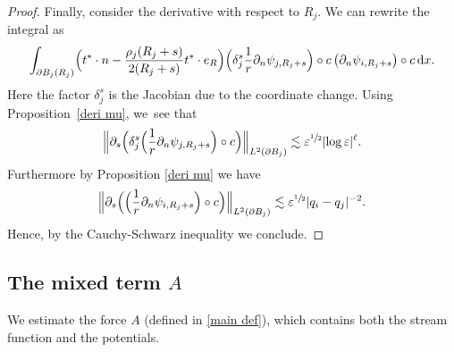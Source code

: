 \documentclass[10pt]{amsart}
\let\epsilon\varepsilon
\theoremstyle{definition}
\newcommand\Bnorm[1]{\Bigl\lVert #1\Bigr\rVert}
\newcommand\dd{\,\mathrm{d}}
\newcommand\dx{\dd x}
\let\de\partial
\let\eps\epsilon
\begin{document}
\begin{proof}
Finally, consider the derivative with respect to $R_j$.
We can rewrite the integral as
\begin{align*}
\int_{\de B_j(R_j)}\Bigl(t^*\cdot n-\frac{\rho_j(R_j+s)}{2(R_j+s)}t^*\cdot e_R\Bigr)\Bigl(\delta_j^s\frac{1}{r}\de_n\psi_{j,R_j+s}\Bigr)\circ c\left(\de_n\psi_{i,R_j+s}\right)\circ c\dx.
\end{align*}
Here the factor $\delta_j^s$ is the Jacobian due to the coordinate change.
Using Proposition~\ref{deri mu}, we~see that
\begin{align*}
\Bnorm{\de_s\Bigl(\delta_j^s\Bigl(\frac{1}{r}\de_n\psi_{j,R_j+s}\Bigr)\circ c\Bigr)}_{L^2(\de B_j)}\lesssim \eps^{\sfrac{1}{2}}|{\log\eps}|^\ell.
\end{align*}
Furthermore by Proposition \ref{deri mu} we have
\begin{align*}
\Bnorm{\de_s \Bigl(\Bigl(\frac{1}{r}\de_n\psi_{i,R_j+s} \Bigr)\circ c \Bigr)}_{L^2(\de B_j)}\lesssim \eps^{\sfrac{1}{2}}|q_i-q_j|^{-2}.
\end{align*}
Hence, by the Cauchy-Schwarz inequality we conclude.
\end{proof}

\subsection{The mixed term $A$}\label{subsec4.2}
We estimate the force $A$ (defined in \ref{main def}), which contains both the stream function and the potentials.
\end{document}
